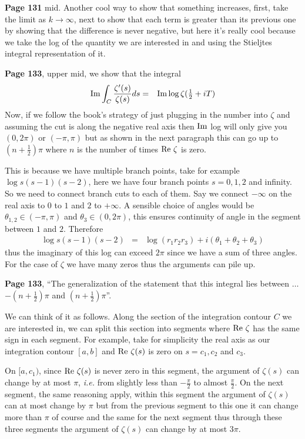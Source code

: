 \documentclass[aps,preprint,preprintnumbers,nofootinbib,showpacs,prd]{revtex4-1}
\newcommand{\ie}{{\it i.e.} }
\newcommand{\nbea}{\begin{eqnarray*}}
\newcommand{\neea}{\end{eqnarray*}}
\def\Im{{\rm Im}}
\newcommand{\re}{{\rm Re}}
\begin{document}
{\bf Page 131} mid. Another cool way to show that something increases, first, take the limit as $k\to\infty$, next to show that each term is greater than its previous one by showing that the difference is never negative, but here it's really cool because we take the log of the quantity we are interested in and using the Stieljtes integral representation of it.  

{\bf Page 133}, upper mid, we show that the integral
%
\nbea
\Im \int_C \frac{\zeta'(s)}{\zeta(s)} ds & = & \Im \log \zeta(\tfrac{1}{2} + iT)
\neea
%
Now, if we follow the book's strategy of just plugging in the number into $\zeta$ and assuming the cut is along the negative real axis then $\Im$ log will only give you $(0,2\pi)$ or $(-\pi,\pi)$ but as shown in the next paragraph this can go up to $(n + \tfrac{1}{2})\pi$ where $n$ is the number of times $\re~\zeta$ is zero.

This is because we have multiple branch points, take for example $\log s(s-1)(s-2)$, here we have four branch points $s = 0, 1, 2$ and infinity. So we need to connect branch cuts to each of them. Say we connect $-\infty$ on the real axis to $0$ to $1$ and $2$ to $+ \infty$. A sensible choice of angles would be $\theta_{1,2} \in (-\pi, \pi)$ and $\theta_3 \in (0,2\pi)$, this ensures continuity of angle in the segment between $1$ and $2$. Therefore
%
\nbea
\log s (s - 1)(s - 2) & = & \log(r_1r_2r_3) + i (\theta_1 + \theta_2 + \theta_3)
\neea
%
thus the imaginary of this log can exceed $2\pi$ since we have a sum of three angles. For the case of $\zeta$ we have many zeros thus the arguments can pile up.

{\bf Page 133}, ``The generalization of the statement that this integral lies between $\dots$ $-(n + \frac{1}{2})\pi$ and $(n + \frac{1}{2})\pi$''. 

We can think of it as follows. Along the section of the integration contour $C$ we are interested in, we can split this section into segments where $\re~\zeta$ has the same sign in each segment. For example, take for simplicity the real axis as our integration contour $[a,b]$ and $\re~\zeta(s)$ is zero on $s = c_1, c_2$ and $c_3$.

On $[a,c_1)$, since $\re~\zeta(s)$ is never zero in this segment, the argument of $\zeta(s)$ can change by at most $\pi$, \ie from slightly less than $- \frac{\pi}{2}$ to almost $\frac{\pi}{2}$. On the next segment, the same reasoning apply, within this segment the argument of $\zeta(s)$ can at most change by $\pi$ but from the previous segment to this one it can change more than $\pi$ of course and the same for the next segment thus through these three segments the argument of $\zeta(s)$ can change by at most $3\pi$.
\end{document}
